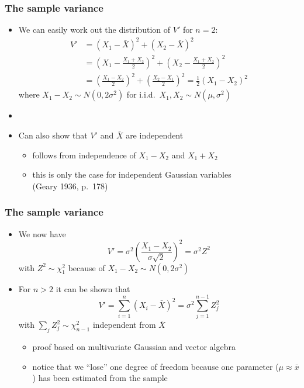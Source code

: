 \documentclass[t]{beamer} %
\begin{document}
\begin{frame}
  \frametitle{The sample variance}

  \begin{itemize}
  \item We can easily work out the distribution of $V'$ for $n=2$:
    \begin{align*}
      V' &= (X_1 - \bar{X})^2 + (X_2 - \bar{X})^2 \\
      &= (X_1 - \tfrac{X_1 + X_2}{2})^2 + (X_2 - \tfrac{X_1 + X_2}{2})^2 \\
      &= (\tfrac{X_1 - X_2}{2})^2 + (\tfrac{X_2 - X_1}{2})^2
      = \frac{1}{2} (X_1 - X_2)^2
    \end{align*}
    where $X_1 - X_2 \sim N(0, 2\sigma^2)$ for i.i.d.\ $X_1, X_2\sim N(\mu,
    \sigma^2)$
  \item[]
  \item Can also show that $V'$ and $\bar{X}$ are independent
    \begin{itemize}
    \item follows from independence of $X_1 - X_2$ and $X_1 + X_2$
    \item this is only the case for independent Gaussian variables\\
      (Geary 1936, p.~178)
    \end{itemize}
  \end{itemize}
\end{frame}

\begin{frame}
  \frametitle{The sample variance}

  \begin{itemize}
  \item We now have
    \[
    V' = \sigma^2 \left( \frac{X_1 - X_2}{\sigma \sqrt{2}} \right)^2
    = \sigma^2 Z^2
    \]
    with $Z^2 \sim \chi^2_1$ because of $X_1 - X_2 \sim N(0, 2\sigma^2)$
    \pause
  \item For $n > 2$ it can be shown that
    \[
    V' = \sum_{i=1}^n (X_i - \bar{X})^2 = \sigma^2 \sum_{j=1}^{n-1} Z_j^2
    \]
    with $\sum_j Z_j^2 \sim \chi^2_{n-1}$ independent from $\bar{X}$
    \begin{itemize}
    \item proof based on multivariate Gaussian and vector algebra
    \item notice that we ``lose'' one degree of freedom because one
      parameter ($\mu \approx \bar{x}$) has been estimated from the sample
    \end{itemize}
  \end{itemize}
\end{frame}
\end{document}
